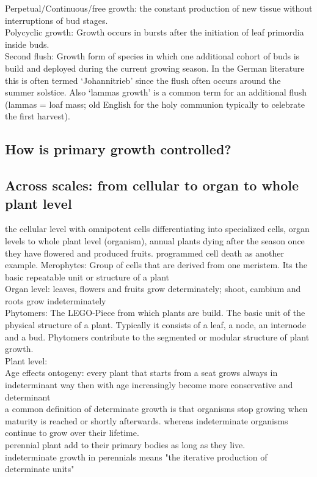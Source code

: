\documentclass{article}
\begin{document}
	Perpetual/Continuous/free growth: the constant production of new tissue without interruptions of bud stages.\\
	Polycyclic growth: Growth occurs in bursts after the initiation of leaf primordia inside buds.  \\
	Second flush: Growth form of species in which one additional cohort of buds is build and deployed during the current growing season. In the German literature this is often termed ‘Johannitrieb’ since the flush often occurs around the summer solstice. Also ‘lammas growth’ is a common term for an additional flush (lammas = loaf mass; old English for the holy communion typically to celebrate the first harvest).\\
	
	\subsection*{How is primary growth controlled?}
	\subsection*{Across scales: from cellular to organ to whole plant level}
	the cellular level with omnipotent cells differentiating into specialized cells, organ levels to whole plant level (organism), annual plants dying after the season once they have flowered and produced fruits. programmed cell death as another example.
	Merophytes: Group of cells that are derived from one meristem. Its the basic repeatable unit or structure of a plant\\
	Organ level: leaves, flowers and fruits grow determinately; shoot, cambium and roots grow indeterminately\\
	Phytomers: The LEGO-Piece from which plants are build. The basic unit of the physical structure of a plant. Typically it consists of a leaf, a node, an internode and a bud. Phytomers contribute to the segmented or modular structure of plant growth. \\
	Plant level:\\
	Age effects ontogeny: every plant that starts from a seat grows always in indeterminant way then with age increasingly become more conservative and determinant\\
	
	a common definition of determinate growth is that organisms stop growing when maturity is reached or shortly afterwards. whereas indeterminate organisms continue to grow over their lifetime.\\
	perennial plant add to their primary bodies as long as they live. \\
	indeterminate growth in perennials means "the iterative production of determinate units"\\
	
\end{document}
